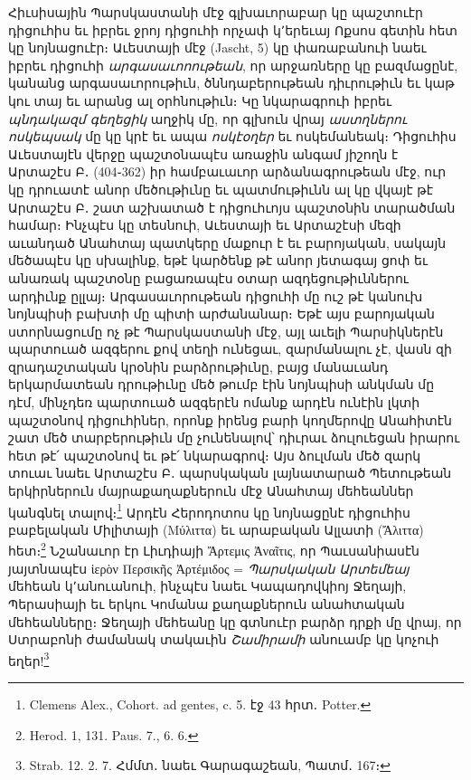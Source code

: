 \documentclass{article}
\begin{document}
{Հիւսիսային Պարսկաստանի մէջ գլխաւորաբար կը պաշտուէր դիցուհիս եւ իբրեւ ջրոյ դիցուհի որչափ կ՚երեւայ Ոքսոս գետին հետ կը նոյնացուէր։ Աւեստայի մէջ (Jascht, 5) կը փառաբանուի նաեւ իբրեւ դիցուհի \emph{արգասաւոոութեան}, որ արջառները կը բազմացընէ, կանանց արգասաւորութիւն, ծննդաբերութեան դիւրութիւն եւ կաթ կու տայ եւ արանց ալ օրհնութիւն։ Կը նկարագրուի իբրեւ \emph{պնդակազմ գեղեցիկ} աղջիկ մը, որ գլխուն վրայ \emph{աստղներու ոսկեպսակ} մը կը կրէ եւ ապա \emph{ոսկէօղեր} եւ ոսկեմանեակ։ Դիցուհիս Աւեստայէն վերջը պաշտօնապէս առաջին անգամ յիշողն է Արտաշէս Բ․ (404֊362) իր համբաւաւոր արձանագրութեան մէջ, ուր կը դրուատէ անոր մեծութիւնը եւ պատմութիւնն ալ կը վկայէ թէ Արտաշէս Բ․ շատ աշխատած է դիցուհւոյս պաշտօնին տարածման համար։ Ինչպէս կը տեսնուի, Աւեստայի եւ Արտաշէսի մեզի աւանդած Անահտայ պատկերը մաքուր է եւ բարոյական, սակայն մեծապէս կը սխալինք, եթէ կարծենք թէ անոր յետագայ ցոփ եւ անառակ պաշտօնը բացառապէս օտար ազդեցութիւններու արդիւնք ըլլայ։ Արգասաւորութեան դիցուհի մը ուշ թէ կանուխ նոյնպիսի բախտի մը պիտի արժանանար։ Եթէ այս բարոյական ստորնացումը ոչ թէ Պարսկաստանի մէջ, այլ աւելի Պարսիկներէն պարտուած ազգերու քով տեղի ունեցաւ, զարմանալու չէ, վասն զի զրադաշտական կրօնին բարձրութիւնը, բայց մանաւանդ երկարմատեան դրութիւնը մեծ թումբ էին նոյնպիսի անկման մը դէմ, մինչդեռ պարտուած ազգերէն ոմանք արդէն ունէին լկտի պաշտօնով դիցուհիներ, որոնք իրենց բարի կողմերովը Անահիտէն շատ մեծ տարբերութիւն մը չունենալով՝ դիւրաւ ձուլուեցան իրարու հետ թէ՛ պաշտօնով եւ թէ՛ նկարագրով։ Այս ձուլման մեծ զարկ տուաւ նաեւ Արտաշէս Բ․ պարսկական լայնատարած Պետութեան երկիրներուն մայրաքաղաքներուն մէջ Անահտայ մեհեաններ կանգնել տալով։\footnote{Clemens Alex., Cohort. ad gentes, c. 5. էջ 43 հրտ․ Potter.} Արդէն Հերոդոտոս կը նոյնացընէ դիցուհիս բաբելական Միլիտայի (Μύλιττα) եւ արաբական Ալլատի (Ἄλιττα) հետ։\footnote{Herod. 1, 131. Paus. 7., 6. 6.} Նշանաւոր էր Լիւդիայի Ἄρτεμις Ἀναῖτις, որ Պաւսանիասէն յայտնապէս ἱερὸν Περσικῆς Ἀρτέμιδος = \emph{Պարսկական Արտեմեայ} մեհեան կ՚անուանուի, ինչպէս նաեւ Կապադովկիոյ Ջեղայի, Պերասիայի եւ երկու Կոմանա քաղաքներուն անահտական մեհեանները։ Ջեղայի մեհեանը կը գտնուէր բարձր դրքի մը վրայ, որ Ստրաբոնի ժամանակ տակաւին \emph{Շամիրամի} անուամբ կը կոչուի եղեր!\footnote{Strab. 12. 2. 7. Հմմտ․ նաեւ Գարագաշեան, Պատմ․ 167։}

}
\end{document}
